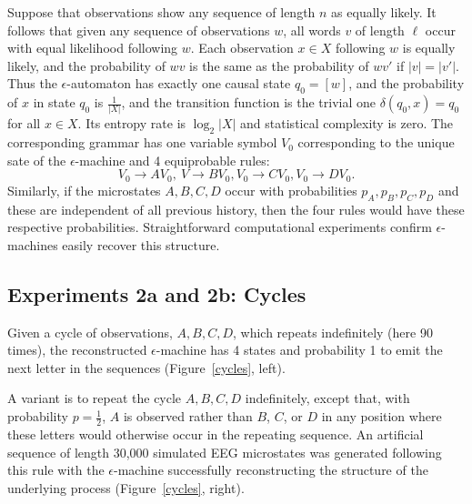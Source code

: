 \documentclass[journal]{IEEEtran}
\begin{document}
Suppose that observations show any sequence of length $n$ as equally likely.  It follows that given any sequence of observations $w$,
all words $v$ of length $\ell$ occur with equal likelihood following $w$. Each observation $x \in X$ following $w$ is equally likely, 
and the probability of $wv$  is the same as the probability of $wv'$ if $|v|=|v'|$.  Thus the $\epsilon$-automaton has exactly one causal state $q_0=[w]$,
and the probability of $x$ in state $q_0$ is $\frac{1}{|X|}$, and the transition function is the trivial one $\delta(q_0,x)=q_0$ for all $x \in X$. Its entropy rate is $\log_2 |X|$ and
statistical complexity is zero. The corresponding grammar has one variable symbol $V_0$ corresponding to the unique sate of the $\epsilon$-machine and 4 equiprobable rules:
$$V_0\rightarrow AV_0,\ V\rightarrow BV_0, V_0\rightarrow CV_0, V_0\rightarrow DV_0.$$
Similarly, if the microstates $A,B,C,D$ occur with probabilities $p_A, p_B, p_C, p_D$ and these are independent of all previous history, then
the four rules would have these respective probabilities.  Straightforward computational experiments confirm $\epsilon$-machines easily recover this structure.

\subsection{Experiments 2a and 2b: Cycles}
Given a cycle of observations, $A, B, C, D$, which repeats indefinitely (here 90 times), the reconstructed $\epsilon$-machine has 4 states and probability 1 to emit the next letter in the sequences (Figure~\ref{cycles}, left). 

A  variant is to repeat the cycle $A, B, C, D$ indefinitely, except that, with probability $p=\frac{1}{2}$, $A$  is observed rather than $B$, $C$, or $D$ in any position where these letters would otherwise occur in the repeating sequence.   An artificial sequence of length 30,000 simulated EEG microstates was generated following this rule with the $\epsilon$-machine
successfully reconstructing the structure of the underlying process (Figure~\ref{cycles}, right).
\end{document}
